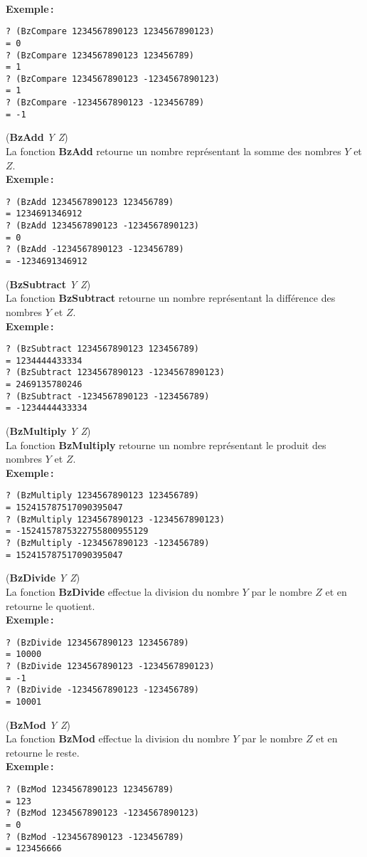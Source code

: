 \\[18pt]
{\bf Exemple\,:}
\begin{verbatim}
? (BzCompare 1234567890123 1234567890123)
= 0
? (BzCompare 1234567890123 123456789)
= 1
? (BzCompare 1234567890123 -1234567890123)
= 1
? (BzCompare -1234567890123 -123456789)
= -1
\end{verbatim}
\vspace*{24pt}
({\bf BzAdd} {\em Y Z})
\\[12pt]
La fonction {\bf BzAdd} retourne un nombre repr\'esentant la somme des nombres
$Y$ et $Z$.
\\[18pt]
{\bf Exemple\,:}
\begin{verbatim}
? (BzAdd 1234567890123 123456789)
= 1234691346912
? (BzAdd 1234567890123 -1234567890123)
= 0
? (BzAdd -1234567890123 -123456789)
= -1234691346912
\end{verbatim}
\vspace*{24pt}
({\bf BzSubtract} {\em Y Z})
\\[12pt]
La fonction {\bf BzSubtract} retourne un nombre repr\'esentant la diff\'erence
des nombres $Y$ et $Z$.
\\[18pt]
{\bf Exemple\,:}
\begin{verbatim}
? (BzSubtract 1234567890123 123456789)
= 1234444433334
? (BzSubtract 1234567890123 -1234567890123)
= 2469135780246
? (BzSubtract -1234567890123 -123456789)
= -1234444433334
\end{verbatim}
\vspace*{24pt}
({\bf BzMultiply} {\em Y Z})
\\[12pt]
La fonction {\bf BzMultiply} retourne un nombre repr\'esentant le produit
des nombres $Y$ et $Z$.
\\[18pt]
{\bf Exemple\,:}
\begin{verbatim}
? (BzMultiply 1234567890123 123456789)
= 152415787517090395047
? (BzMultiply 1234567890123 -1234567890123)
= -1524157875322755800955129
? (BzMultiply -1234567890123 -123456789)
= 152415787517090395047
\end{verbatim}
\vspace*{24pt}
({\bf BzDivide} {\em Y Z})
\\[12pt]
La fonction {\bf BzDivide} effectue la division du nombre $Y$ par le
nombre $Z$ et en retourne le quotient.
\\[18pt]
{\bf Exemple\,:}
\begin{verbatim}
? (BzDivide 1234567890123 123456789)
= 10000
? (BzDivide 1234567890123 -1234567890123)
= -1
? (BzDivide -1234567890123 -123456789)
= 10001
\end{verbatim}
\vspace*{24pt}
({\bf BzMod} {\em Y Z})
\\[12pt]
La fonction {\bf BzMod} effectue la division du nombre $Y$ par le
nombre $Z$ et en retourne le reste.
\\[18pt]
{\bf Exemple\,:}
\begin{verbatim}
? (BzMod 1234567890123 123456789)
= 123
? (BzMod 1234567890123 -1234567890123)
= 0
? (BzMod -1234567890123 -123456789)
= 123456666
\end{verbatim}
\vspace*{15pt}

